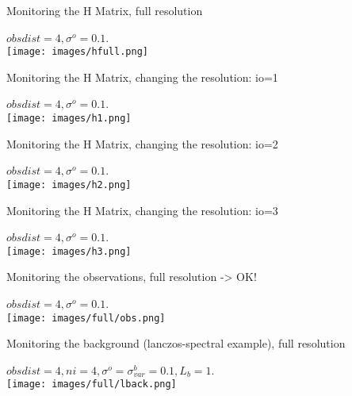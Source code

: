 \documentclass[francais]{beamer}
\begin{document}
\begin{frame}{Monitoring the H Matrix, full resolution}
\begin{center}
$obsdist=4,\sigma^o=0.1$.\\
 \texttt{[image: images/hfull.png]}
\end{center}
\end{frame}

\begin{frame}{Monitoring the H Matrix, changing the resolution: io=1}
\begin{center}
$obsdist=4,\sigma^o=0.1$.\\
 \texttt{[image: images/h1.png]}
\end{center}
\end{frame}
\begin{frame}{Monitoring the H Matrix, changing the resolution: io=2}
\begin{center}
$obsdist=4,\sigma^o=0.1$.\\
 \texttt{[image: images/h2.png]}
\end{center}
\end{frame}
\begin{frame}{Monitoring the H Matrix, changing the resolution: io=3}
\begin{center}
$obsdist=4,\sigma^o=0.1$.\\
 \texttt{[image: images/h3.png]}
\end{center}
\end{frame}

\begin{frame}{Monitoring the observations, full resolution -> OK!}
\begin{center}
$obsdist=4,\sigma^o=0.1$.\\
 \texttt{[image: images/full/obs.png]}
\end{center}
\end{frame}
\begin{frame}{Monitoring the background (lanczos-spectral example), full resolution}
\begin{center}
$obsdist=4, ni=4, \sigma^o=\sigma^b_{var}=0.1, L_b=1$.\\
 \texttt{[image: images/full/lback.png]}
\end{center}
\end{frame}
\end{document}
